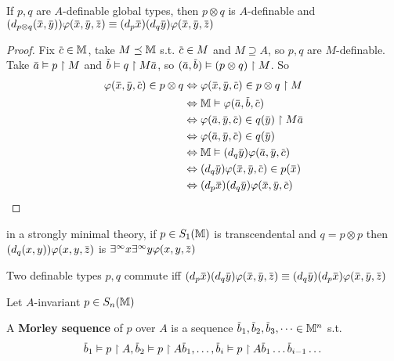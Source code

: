 \documentclass[11pt]{article}
\begin{document}
\begin{proposition}[]
\label{3.10.26}
If \(p,q\) are \(A\)-definable global types, then \(p\otimes q\) is \(A\)-definable
and \((d_{p\otimes q}(\barx,\bary))\varphi(\barx,\bary,\barz)\equiv(d_p\barx)(d_q\bary)\varphi(\barx,\bary,\barz)\)
\end{proposition}

\begin{proof}
Fix \(\barc\in\M\), take \(M\preceq\mathbb{M}\) s.t. \(\barc\in M\) and \(M\supseteq A\), so \(p,q\) are \(M\)-definable.
Take \(\bara\vDash p\uhr M\) and \(\barb\vDash q\uhr M\bara\), so \((\bara,\barb)\vDash(p\otimes q)\uhr M\). So
\begin{align*}
\varphi(\barx,\bary,\barc)\in p\otimes q&\Leftrightarrow \varphi(\barx,\bary,\barc)\in p\otimes q\uhr M\\
&\Leftrightarrow\M\vDash\varphi(\bara,\barb,\barc)\\&\Leftrightarrow\varphi(\bara,\bary,\barc)\in q(\bary)\uhr M\bara\\
&\Leftrightarrow\varphi(\bara,\bary,\barc)\in q(\bary)\\
&\Leftrightarrow\M\vDash(d_q\bary)\varphi(\bara,\bary,\barc)\\
&\Leftrightarrow(d_q\bary)\varphi(\barx,\bary,\barc)\in p(\barx)\\
&\Leftrightarrow(d_p\barx)(d_q\bary)\varphi(\barx,\bary,\barc)
\end{align*}
\end{proof}

\begin{examplle}[]
in a strongly minimal theory, if \(p\in S_1(\mathbb{M})\) is transcendental and \(q=p\otimes p\)
then \((d_q(x,y))\varphi(x,y,\barz)\) is \(\exists^\infty x\exists^\infty y\varphi(x,y,\barz)\)
\end{examplle}

Two definable types \(p,q\) commute
iff \((d_p\barx)(d_q\bary)\varphi(\barx,\bary,\barz)\equiv(d_q\bary)(d_p\barx)\varphi(\barx,\bary,\barz)\)

Let \(A\)-invariant \(p\in S_n(\mathbb{M})\)
\begin{definition}[]
A \textbf{Morley sequence} of \(p\) over \(A\) is a sequence \(\barb_1,\barb_2,\barb_3,\dots\in\M^n\) s.t.
\begin{equation*}
\barb_1\vDash p\uhr A,\barb_2\vDash p\uhr A\barb_1,\dots,\barb_i\vDash p\uhr A\barb_1\dots\barb_{i-1}\dots
\end{equation*}
\end{definition}
\end{document}
